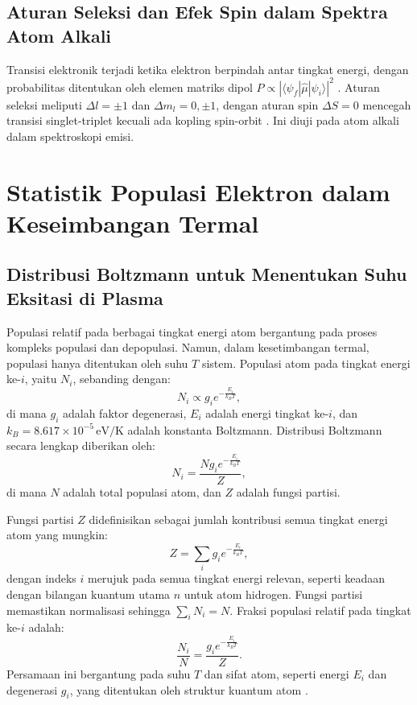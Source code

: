 \subsection{Aturan Seleksi dan Efek Spin dalam Spektra Atom Alkali}
Transisi elektronik terjadi ketika elektron berpindah antar tingkat energi, dengan probabilitas ditentukan oleh elemen matriks dipol $P \propto |\langle \psi_f | \hat{\mu} | \psi_i \rangle|^2$ \citep{Demtroder2010}. Aturan seleksi meliputi $\Delta l = \pm 1$ dan $\Delta m_l = 0, \pm 1$, dengan aturan spin $\Delta S = 0$ mencegah transisi singlet-triplet kecuali ada kopling spin-orbit \citep{Griffiths2005}. Ini diuji pada atom alkali dalam spektroskopi emisi.

\section{Statistik Populasi Elektron dalam Keseimbangan Termal}

\subsection{Distribusi Boltzmann untuk Menentukan Suhu Eksitasi di Plasma}

Populasi relatif pada berbagai tingkat energi atom bergantung pada proses kompleks populasi dan depopulasi. Namun, dalam kesetimbangan termal, populasi hanya ditentukan oleh suhu \( T \) sistem. Populasi atom pada tingkat energi ke-\( i \), yaitu \( N_i \), sebanding dengan:
\begin{equation}
N_i \propto g_i e^{-\frac{E_i}{k_B T}}, \label{eq:boltzmann_propto}
\end{equation}
di mana \( g_i \) adalah faktor degenerasi, \( E_i \) adalah energi tingkat ke-\( i \), dan \( k_B = 8.617 \times 10^{-5} \, \text{eV/K} \) adalah konstanta Boltzmann. Distribusi Boltzmann secara lengkap diberikan oleh:
\begin{equation}
N_i = \frac{N g_i e^{-\frac{E_i}{k_B T}}}{Z}, \label{eq:boltzmann}
\end{equation}
di mana \( N \) adalah total populasi atom, dan \( Z \) adalah fungsi partisi.

Fungsi partisi \( Z \) didefinisikan sebagai jumlah kontribusi semua tingkat energi atom yang mungkin:
\begin{equation}
Z = \sum_i g_i e^{-\frac{E_i}{k_B T}}, \label{eq:partition}
\end{equation}
dengan indeks \( i \) merujuk pada semua tingkat energi relevan, seperti keadaan dengan bilangan kuantum utama \( n \) untuk atom hidrogen. Fungsi partisi memastikan normalisasi sehingga \( \sum_i N_i = N \). Fraksi populasi relatif pada tingkat ke-\( i \) adalah:
\begin{equation}
\frac{N_i}{N} = \frac{g_i e^{-\frac{E_i}{k_B T}}}{Z}. \label{eq:rel_population}
\end{equation}
Persamaan ini bergantung pada suhu \( T \) dan sifat atom, seperti energi \( E_i \) dan degenerasi \( g_i \), yang ditentukan oleh struktur kuantum atom \citep{Pathria2011,rybicki-1985}.

